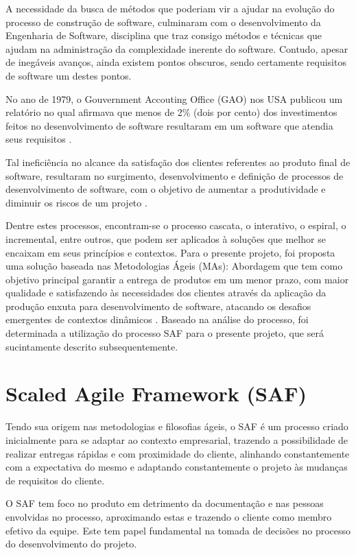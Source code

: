 A necessidade da busca de métodos que poderiam vir a ajudar na evolução do processo de construção de software, culminaram com o desenvolvimento da Engenharia de Software, disciplina que traz consigo métodos e técnicas que ajudam na administração da complexidade inerente do software. Contudo, apesar de inegáveis avanços, ainda existem pontos obscuros, sendo certamente requisitos de software um destes pontos.

No ano de 1979, o Gouvernment Accouting Office (GAO) nos USA publicou um relatório no qual afirmava que menos de 2\% (dois por cento) dos investimentos feitos no desenvolvimento de software resultaram em um software que atendia seus requisitos \cite{paulo}.

Tal ineficiência no alcance da satisfação dos clientes referentes ao produto final de software, resultaram no surgimento, desenvolvimento e definição de processos de desenvolvimento de software, com o objetivo de aumentar a produtividade e diminuir os riscos de um projeto \cite{vieiraM}.

Dentre estes processos, encontram-se o processo cascata, o interativo, o espiral, o incremental, entre outros, que podem ser aplicados à soluções que melhor se encaixam em seus princípios e contextos. Para o presente projeto, foi proposta uma solução baseada nas Metodologias Ágeis (MAs): Abordagem que tem como objetivo principal garantir a entrega de produtos em um menor prazo, com maior qualidade e satisfazendo às necessidades dos clientes através da aplicação da produção enxuta para desenvolvimento de software, atacando os desafios emergentes de contextos dinâmicos \cite{Poppendieck}. Baseado na análise do processo, foi determinada a utilização do processo SAF para o presente projeto, que será sucintamente descrito subsequentemente.

\section {Scaled Agile Framework (SAF)}

Tendo sua origem nas metodologias e filosofias ágeis, o SAF é um processo criado inicialmente para se adaptar ao contexto empresarial, trazendo a possibilidade de realizar entregas rápidas e com proximidade do cliente, alinhando constantemente com a expectativa do mesmo e adaptando constantemente o projeto às mudanças de requisitos do cliente.

O SAF tem foco  no produto em detrimento da documentação e nas pessoas envolvidas no processo, aproximando estas e trazendo o cliente como membro efetivo da equipe. Este tem papel fundamental na tomada de decisões no processo do desenvolvimento do projeto.

